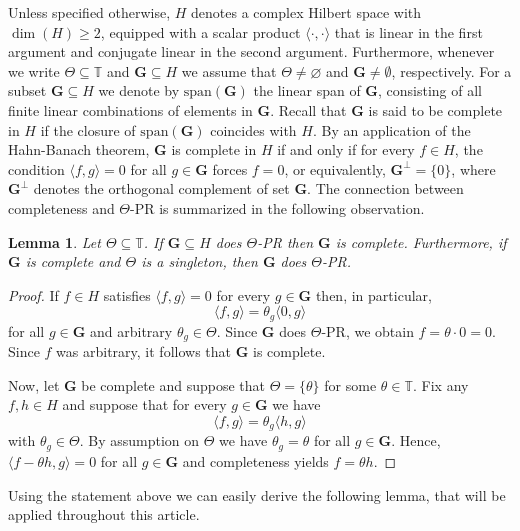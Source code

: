\documentclass[reqno,a4paper,11pt]{amsart}
\numberwithin{equation}{section}
\newtheorem{lemma}[definition]{Lemma}
\def\T{{\mathbb T}}
\newcommand{\lspan}{{\mathrm{span}}}
\newcommand\1{\mathds{1}}
\begin{document}
Unless specified otherwise, $H$ denotes a complex Hilbert space with $\dim(H)\geq 2$, equipped with a scalar product $\langle \cdot, \cdot \rangle$ that is linear in the first argument and conjugate linear in the second argument. Furthermore, whenever we write $\Theta \subseteq \T$ and $\mathbf{G}\subseteq H$ we assume that $\Theta \neq \varnothing$ and $\mathbf{G}\neq \emptyset$, respectively. For a subset $\mathbf{G} \subseteq H$ we denote by $\lspan(\mathbf{G})$ the linear span of $\mathbf{G}$, consisting of all finite linear combinations of elements in $\mathbf{G}$. Recall that $\mathbf{G}$ is said to be complete in $H$ if the closure of $\lspan(\mathbf{G})$ coincides with $H$. By an application of the Hahn-Banach theorem, $\mathbf{G}$ is complete in $H$ if and only if for every $f \in H$, the condition $\langle f,g \rangle =0$ for all $g \in \mathbf{G}$ forces $f=0$, or equivalently, $\mathbf{G}^\perp=\{0\}$, where $\mathbf{G}^\perp$ denotes the orthogonal complement of set $\mathbf{G}$. The connection between completeness and $\Theta$-PR is summarized in the following observation.

\begin{lemma}\label{lma:completeness}
Let $\Theta\subseteq\T$. If $\mathbf{G} \subseteq H$ does $\Theta$-PR then $\mathbf{G}$ is complete. Furthermore, if $\mathbf{G}$ is complete and $\Theta$ is a singleton, then $\mathbf{G}$ does $\Theta$-PR.
\end{lemma}
\begin{proof}
If $f \in H$ satisfies $\langle f,g\rangle=0$ for every $g\in\mathbf{G}$ then, in particular, 
$$\langle f,g\rangle = \theta_g\langle0,g\rangle$$
for all $g \in \mathbf{G}$ and arbitrary $\theta_g \in \Theta$.
Since $\mathbf{G}$ does $\Theta$-PR, we obtain $f=\theta\cdot 0 = 0$. Since $f$ was arbitrary, it follows that $\mathbf{G}$ is complete.

    Now, let $\mathbf{G}$ be complete and suppose that $\Theta=\{\theta\}$ for some $\theta \in \T$. Fix any $f,h\in H$ and suppose that for every $g\in \mathbf{G}$ we have $$\langle f,g\rangle = \theta_g \langle h,g\rangle$$ with $\theta_g \in \Theta$. By assumption on $\Theta$ we have $\theta_g = \theta$ for all $g \in \mathbf{G}$. Hence, $\langle f-\theta h,g\rangle = 0$ for all $g \in \mathbf{G}$ and completeness yields $f=\theta h$.
\end{proof}

Using the statement above we can easily derive the following lemma, that will be applied throughout this article.
\end{document}
